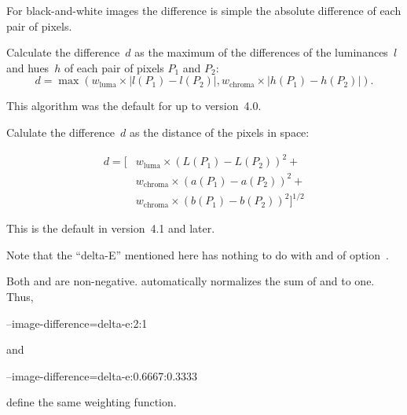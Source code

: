 \begin{codelist}
  For black-and-white images the difference is simple the absolute
  difference of each pair of pixels.

  \begin{codelist}
  \item[\itempar{maximum-hue-luminance \\ maximum-hue-lum
      \\ max-hue-luminance \\ max-hue-lum \\ max}]\itemend Calculate
    the difference~$d$ as the maximum
      of
    the differences of the luminances~$l$ and hues~$h$ of each pair
    of pixels $P_1$ and $P_2$:
    \[
    d  = \max\left(w_{\mathrm{luma}} \times |l(P_1) - l(P_2)|,
    w_{\mathrm{chroma}} \times |h(P_1) - h(P_2)|\right).
    \]

    This algorithm was the default for \App{} up to version~4.0.

  \item[\itempar{delta-e \\ de}\genidx{delta-E}]\itemend Calulate the
    difference~$d$ as the  distance of the
    pixels in 
    space:

    \begin{align*}
      d = \Big[ & w_{\mathrm{luma}} \times \left(L(P_1) - L(P_2)\right)^2 + \\
                & w_{\mathrm{chroma}} \times \left(a(P_1) - a(P_2)\right)^2 + \\
                & w_{\mathrm{chroma}} \times \left(b(P_1) - b(P_2)\right)^2
        \Big]^{1/2}
    \end{align*}

    This is the default in \App{} version~4.1 and later.

    Note that the ``delta-E'' mentioned here has nothing to do with
     and  of
    option~.
  \end{codelist}

  \begin{sloppypar}
    Both  and
     are non-negative.  \App{}
    automatically normalizes the sum of
     and
     to one.  Thus,
  \end{sloppypar}
  \begin{literal}
    --image-difference=delta-e:2:1
  \end{literal}
  and
  \begin{literal}
    --image-difference=delta-e:0.6667:0.3333
  \end{literal}
  define the same weighting function.


\end{codelist}
